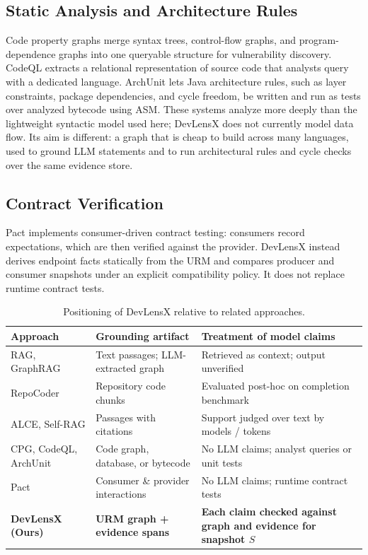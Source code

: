 \documentclass[runningheads]{llncs}
\begin{document}
\subsection{Static Analysis and Architecture Rules}
Code property graphs \cite{yamaguchi2014cpg} merge syntax trees, control-flow graphs, and program-dependence graphs into one queryable structure for vulnerability discovery. CodeQL \cite{codeql2024} extracts a relational representation of source code that analysts query with a dedicated language. ArchUnit \cite{archunit2024} lets Java architecture rules, such as layer constraints, package dependencies, and cycle freedom, be written and run as tests over analyzed bytecode using ASM. These systems analyze more deeply than the lightweight syntactic model used here; DevLensX does not currently model data flow. Its aim is different: a graph that is cheap to build across many languages, used to ground LLM statements and to run architectural rules and cycle checks over the same evidence store.

\subsection{Contract Verification}
Pact \cite{pact2024} implements consumer-driven contract testing: consumers record expectations, which are then verified against the provider. DevLensX instead derives endpoint facts statically from the URM and compares producer and consumer snapshots under an explicit compatibility policy. It does not replace runtime contract tests.

\begin{table}[t]
\centering
\caption{Positioning of DevLensX relative to related approaches.}
\label{tab:positioning}
\begin{tabular}{p{3.2cm}p{4.2cm}p{4.2cm}}
\toprule
\textbf{Approach} & \textbf{Grounding artifact} & \textbf{Treatment of model claims} \\
\midrule
RAG, GraphRAG \cite{lewis2020rag,edge2024graphrag} & Text passages; LLM-extracted graph & Retrieved as context; output unverified \\
RepoCoder \cite{zhang2023repocoder} & Repository code chunks & Evaluated post-hoc on completion benchmark \\
ALCE, Self-RAG \cite{gao2023alce,asai2024selfrag} & Passages with citations & Support judged over text by models / tokens \\
CPG, CodeQL, ArchUnit & Code graph, database, or bytecode & No LLM claims; analyst queries or unit tests \\
Pact \cite{pact2024} & Consumer \& provider interactions & No LLM claims; runtime contract tests \\
\textbf{DevLensX (Ours)} & \textbf{URM graph + evidence spans} & \textbf{Each claim checked against graph and evidence for snapshot $S$} \\
\bottomrule
\end{tabular}
\end{table}
\end{document}

